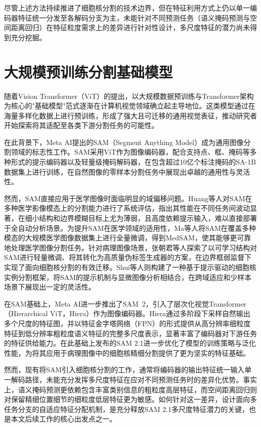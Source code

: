 \documentclass{sufethesismas}
\begin{document}
尽管上述方法持续推进了细胞核分割的技术边界，但在特征利用方式上仍以单一编码器特征统一分发至各解码分支为主，未能针对不同预测任务（语义掩码预测与空间距离回归）在特征粒度需求上的差异进行针对性设计，多尺度特征的潜力尚未得到充分挖掘。

\section{大规模预训练分割基础模型}

随着Vision Transformer（ViT）\cite{Dosovitskiy2021}的提出，以大规模数据预训练与Transformer架构为核心的"基础模型"范式逐渐在计算机视觉领域确立起主导地位。这类模型通过在海量多样化数据上进行预训练，形成了强大且可迁移的通用视觉表征，推动研究者开始探索将其适配至各类下游分割任务的可能性。

在此背景下，Meta AI提出的SAM（Segment Anything Model）\cite{Kirillov2023}成为通用图像分割领域的标志性工作。SAM采用ViT作为图像编码器，配合支持点、框、掩码等多种形式的提示编码器以及轻量级掩码解码器，在包含超过10亿个标注掩码的SA-1B数据集上进行训练，在自然图像的零样本分割任务中展现出卓越的通用性与灵活性。

然而，SAM直接应用于医学图像时面临明显的域偏移问题。Huang等人\cite{Huang2024}对SAM在多种医学影像模态上的分割能力进行了系统评估，指出其性能在不同任务间波动显著，在细小结构和边界模糊目标上尤为薄弱，且高度依赖提示输入，难以直接部署于全自动分析场景。为提升SAM在医学领域的适用性，Ma等人\cite{Ma2024}将SAM在覆盖多种模态的大规模医学图像数据集上进行全量微调，得到MedSAM，使其能够更可靠地处理医学图像分割任务。针对病理图像场景，张朝君等人探索了以可学习结构对SAM进行轻量微调、将其转化为高质量伪标签生成器的方案，在边界框弱监督下实现了面向细胞核分割的有效迁移。Shui等人\cite{Shui2025}则构建了一种基于提示驱动的细胞核实例分割框架，将SAM的提示机制与显微图像分析相结合，在跨域适应和少样本场景下展现出一定的灵活性。

在SAM基础上，Meta AI进一步推出了SAM~2\cite{Ravi2024}，引入了层次化视觉Transformer（Hierarchical ViT，Hiera）作为图像编码器。Hiera通过多阶段下采样自然输出多个尺度的特征图，并以特征金字塔网络（FPN）的形式提供从高分辨率细粒度特征到低分辨率粗粒度语义特征的完整多尺度表示，显著丰富了编码器对下游任务的特征供给能力。在此基础上发布的SAM 2.1进一步优化了模型的训练策略与泛化性能，为将其应用于病理图像中的细胞核精细分割提供了更为坚实的特征基础。

然而，现有将SAM引入细胞核分割的工作，通常将编码器的输出特征统一输入单一解码路径，未能充分发挥多尺度特征在应对不同预测任务时的差异化优势。事实上，语义掩码预测更依赖包含丰富类别信息的粗粒度高层特征，而空间距离回归则对保留精细位置细节的细粒度低层特征更为敏感。如何针对这一差异，设计面向多任务分支的自适应特征分配机制，是充分释放SAM 2.1多尺度特征潜力的关键，也是本文后续工作的核心出发点之一。
\end{document}
